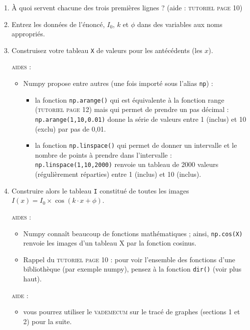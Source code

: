 \documentclass[11pt]{article}
\begin{document}
\begin{enumerate}
 \item À quoi servent chacune des trois premières lignes ? (aide : \textsc{tutoriel page 10})
 
 \medskip
 \item Entrez les données de l'énoncé, $I_0$, $k$ et $\phi$ dans des variables aux noms appropriés.
 
 \medskip
 \item Construisez votre tableau \texttt{X} de valeurs pour les antécédents (les $x$). 
 
 \smallskip
\textsc{aides : }
\begin{itemize}
 \item Numpy propose entre autres (une fois importé sous l'alias \texttt{np}) : 
 \begin{itemize}
  \item la fonction \texttt{np.arange()} qui est équivalente à la fonction range (\textsc{tutoriel page 12}) mais qui permet de prendre un pas décimal : \texttt{np.arange(1,10,0.01)} donne la série de valeurs entre 1 (inclus) et 10 (exclu) par pas de 0,01.
  \item la fonction \texttt{np.linspace()} qui permet de donner un intervalle et le nombre de points à prendre dans l'intervalle : \texttt{np.linspace(1,10,2000)} renvoie un tableau de 2000 valeurs (régulièrement réparties) entre 1 (inclus) et 10 (inclus).
\end{itemize}
\end{itemize}
 
 \medskip
 
 \item Construire alors le tableau \texttt{I} constitué de toutes les images  $I(x) = I_0\times \cos (k\cdot x + \phi )$.
 
 
 \smallskip
\textsc{aides : }
\begin{itemize}
 \item Numpy connaît beaucoup de fonctions mathématiques ; ainsi, \texttt{np.cos(X)} renvoie les images d'un tableau X par la fonction cosinus.
  \item Rappel du \textsc{tutoriel page 10} : pour voir l'ensemble des fonctions d'une bibliothèque (par exemple numpy), pensez à la fonction \texttt{dir()} (voir plus haut). 
\end{itemize}
 
 
 
 \medskip
 
\smallskip
\textsc{aide : }
\begin{itemize}
 \item vous pourrez utiliser le \textsc{vademecum} sur le tracé de graphes (sections 1 et 2) pour la suite.
 \end{itemize}
 

\end{enumerate}
\end{document}
